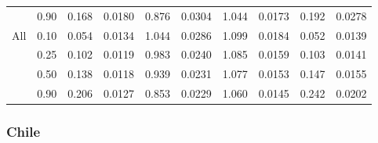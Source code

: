 \documentclass[11pt]{article}
\begin{document}
\begin{table}[H]
\begin{tabular}{cccccccccc}
   & 0.90 & 0.168 & 0.0180 & 0.876 & 0.0304 & 1.044 & 0.0173 & 0.192 & 0.0278 \\ 
  All & 0.10 & 0.054 & 0.0134 & 1.044 & 0.0286 & 1.099 & 0.0184 & 0.052 & 0.0139 \\ 
   & 0.25 & 0.102 & 0.0119 & 0.983 & 0.0240 & 1.085 & 0.0159 & 0.103 & 0.0141 \\ 
   & 0.50 & 0.138 & 0.0118 & 0.939 & 0.0231 & 1.077 & 0.0153 & 0.147 & 0.0155 \\ 
   & 0.90 & 0.206 & 0.0127 & 0.853 & 0.0229 & 1.060 & 0.0145 & 0.242 & 0.0202 \\ 
   \hline
\end{tabular}
\label{USestACF}
\end{table}
\subsubsection{Chile}
\end{document}
